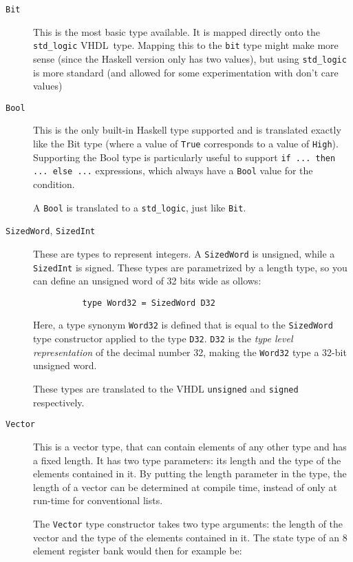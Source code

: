 \documentclass[conference]{IEEEtran}
\def\VHDL{\textsc{VHDL}}
\def\hs#1{\texttt{#1}}
\begin{document}
    \begin{description}
      \item[\hs{Bit}]
        This is the most basic type available. It is mapped directly onto
        the \texttt{std\_logic} \VHDL\ type. Mapping this to the
        \texttt{bit} type might make more sense (since the Haskell version
        only has two values), but using \texttt{std\_logic} is more standard
        (and allowed for some experimentation with don't care values)

      \item[\hs{Bool}]
        This is the only built-in Haskell type supported and is translated
        exactly like the Bit type (where a value of \hs{True} corresponds to a
        value of \hs{High}). Supporting the Bool type is particularly
        useful to support \hs{if ... then ... else ...} expressions, which
        always have a \hs{Bool} value for the condition.

        A \hs{Bool} is translated to a \texttt{std\_logic}, just like \hs{Bit}.
      \item[\hs{SizedWord}, \hs{SizedInt}]
        These are types to represent integers. A \hs{SizedWord} is unsigned,
        while a \hs{SizedInt} is signed. These types are parametrized by a
        length type, so you can define an unsigned word of 32 bits wide as
        ollows:

        \begin{verbatim}
          type Word32 = SizedWord D32
        \end{verbatim}

        Here, a type synonym \hs{Word32} is defined that is equal to the
        \hs{SizedWord} type constructor applied to the type \hs{D32}. \hs{D32}
        is the \emph{type level representation} of the decimal number 32,
        making the \hs{Word32} type a 32-bit unsigned word.

        These types are translated to the \small{VHDL} \texttt{unsigned} and
        \texttt{signed} respectively.
      \item[\hs{Vector}]
        This is a vector type, that can contain elements of any other type and
        has a fixed length. It has two type parameters: its
        length and the type of the elements contained in it. By putting the
        length parameter in the type, the length of a vector can be determined
        at compile time, instead of only at run-time for conventional lists.

        The \hs{Vector} type constructor takes two type arguments: the length
        of the vector and the type of the elements contained in it. The state
        type of an 8 element register bank would then for example be:


\end{description}
\end{document}
